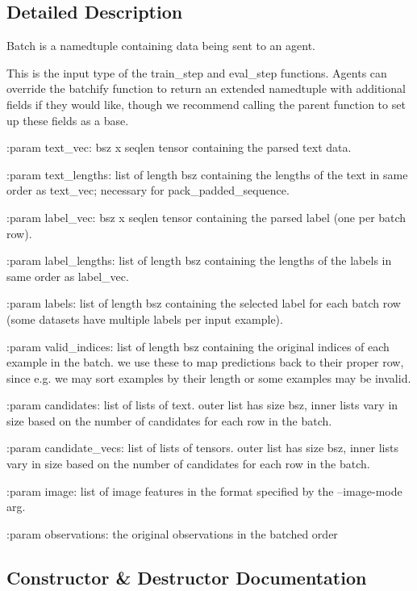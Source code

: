 \subsection{Detailed Description}
\begin{DoxyVerb}Batch is a namedtuple containing data being sent to an agent.

This is the input type of the train_step and eval_step functions.
Agents can override the batchify function to return an extended namedtuple
with additional fields if they would like, though we recommend calling the
parent function to set up these fields as a base.

:param text_vec:
    bsz x seqlen tensor containing the parsed text data.

:param text_lengths:
    list of length bsz containing the lengths of the text in same order as
    text_vec; necessary for pack_padded_sequence.

:param label_vec:
    bsz x seqlen tensor containing the parsed label (one per batch row).

:param label_lengths:
    list of length bsz containing the lengths of the labels in same order as
    label_vec.

:param labels:
    list of length bsz containing the selected label for each batch row (some
    datasets have multiple labels per input example).

:param valid_indices:
    list of length bsz containing the original indices of each example in the
    batch. we use these to map predictions back to their proper row, since e.g.
    we may sort examples by their length or some examples may be invalid.

:param candidates:
    list of lists of text. outer list has size bsz, inner lists vary in size
    based on the number of candidates for each row in the batch.

:param candidate_vecs:
    list of lists of tensors. outer list has size bsz, inner lists vary in size
    based on the number of candidates for each row in the batch.

:param image:
    list of image features in the format specified by the --image-mode arg.

:param observations:
    the original observations in the batched order
\end{DoxyVerb}
 

\subsection{Constructor \& Destructor Documentation}
\mbox{\label{classparlai_1_1core_1_1torch__agent_1_1Batch_a6ef9b406e741e455da515aa8f84c798e}} 
